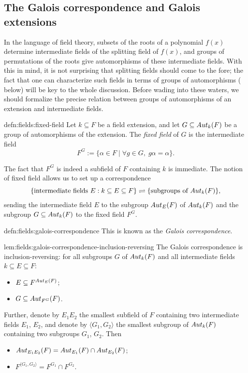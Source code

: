 \subsection{The Galois correspondence and Galois extensions}
\label{subsec:fields:the-galois-correspondence-and-galois-extensions}
In the language of field theory, subsets of the roots of a polynomial
$f(x)$ determine intermediate fields of the splitting field of $f(x)$,
and groups of permutations of the roots give automorphisms of these
intermediate fields. With this in mind, it is not surprising that
splitting fields should come to the fore; the fact that one can
characterize such fields in terms of groups of automorphisms
( below) will be key to the whole
discussion. Before wading into these waters, we should formalize the
precise relation between groups of automorphisms of an extension and
intermediate fields.
\begin{defn}{}{defn:fields:fixed-field}
  Let $k \subseteq F$ be a field extension, and let
  $G \subseteq Aut_k(F)$ be a group of automorphisms of the
  extension. The \emph{fixed field} of $G$ is the intermediate field
  \[
    F^G := \{\alpha \in F \mid \forall g \in G,\; g\alpha = \alpha\}.
  \]
\end{defn}
The fact that $F^G$ is indeed a subfield of $F$ containing $k$ is
immediate. The notion of fixed field allows us to set up a
correspondence
\[
  \{\text{intermediate fields } E : k \subseteq E \subseteq F\}
  \rightleftharpoons \{\text{subgroups of } Aut_k(F)\},
\]
sending the intermediate field $E$ to the subgroup $Aut_E(F)$ of
$Aut_k(F)$ and the subgroup $G \subseteq Aut_k(F)$ to the fixed
field $F^G$.
\begin{defn}{}{defn:fields:galois-correspondence}
  This is known as the \emph{Galois correspondence}.
\end{defn}
\begin{lem}{}{lem:fields:galois-correspondence-inclusion-reversing}
  The Galois correspondence is inclusion-reversing: for all subgroups
  $G$ of $Aut_k(F)$ and all intermediate fields
  $k \subseteq E \subseteq F$:
  \begin{itemize}
  \item $E \subseteq F^{Aut_E(F)}$;
  \item $G \subseteq Aut_{F^G}(F)$.
  \end{itemize}
  Further, denote by $E_1 E_2$ the smallest subfield of $F$ containing
  two intermediate fields $E_1$, $E_2$, and denote by
  $\langle G_1, G_2 \rangle$ the smallest subgroup of $Aut_k(F)$
  containing two subgroups $G_1$, $G_2$. Then
  \begin{itemize}
  \item $Aut_{E_1 E_2}(F) = Aut_{E_1}(F) \cap Aut_{E_2}(F)$;
  \item $F^{\langle G_1, G_2 \rangle} = F^{G_1} \cap F^{G_2}$.
  \end{itemize}
\end{lem}
